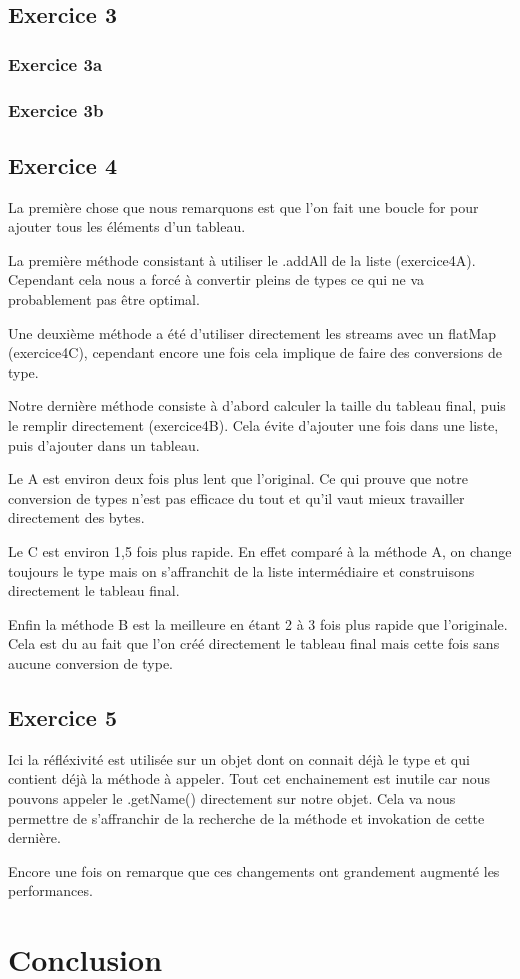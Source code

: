 \documentclass{report}
\begin{document}
	
	\section{Exercice 3}
		\subsection{Exercice 3a}
		
		\subsection{Exercice 3b}

	\section{Exercice 4}
		La première chose que nous remarquons est que l'on fait une boucle for pour ajouter tous les éléments d'un tableau.
		
		La première méthode consistant à utiliser le .addAll de la liste (exercice4A).
		Cependant cela nous a forcé à convertir pleins de types ce qui ne va probablement pas être optimal.
		
		Une deuxième méthode a été d'utiliser directement les streams avec un flatMap (exercice4C), cependant encore une fois cela implique de faire des conversions de type.
		
		Notre dernière méthode consiste à d'abord calculer la taille du tableau final, puis le remplir directement (exercice4B).
		Cela évite d'ajouter une fois dans une liste, puis d'ajouter dans un tableau.
		
		
		
		Le A est environ deux fois plus lent que l'original.
		Ce qui prouve que notre conversion de types n'est pas efficace du tout et qu'il vaut mieux travailler directement des bytes.
		
		Le C est environ 1,5 fois plus rapide.
		En effet comparé à la méthode A, on change toujours le type mais on s'affranchit de la liste intermédiaire et construisons directement le tableau final.
		
		Enfin la méthode B est la meilleure en étant 2 à 3 fois plus rapide que l'originale.
		Cela est du au fait que l'on créé directement le tableau final mais cette fois sans aucune conversion de type.
	
	\section{Exercice 5}
		Ici la réfléxivité est utilisée sur un objet dont on connait déjà le type et qui contient déjà la méthode à appeler.
		Tout cet enchainement est inutile car nous pouvons appeler le .getName() directement sur notre objet.
		Cela va nous permettre de s'affranchir de la recherche de la méthode et invokation de cette dernière.
		
		
		
		Encore une fois on remarque que ces changements ont grandement augmenté les performances.
	
	\chapter{Conclusion}
\end{document}
